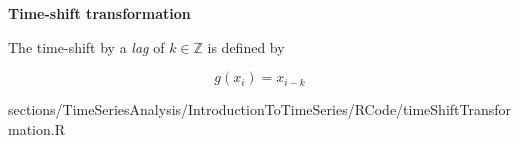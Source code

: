 			
			\RTheory
			{
				\textbf{Time-shift transformation}
								
				The time-shift by a \textit{lag} of $k \in \mathbb{Z}$ is defined by
					
					$$g(x_i)=x_{i-k} $$ 
				
			
			}
			{
				sections/TimeSeriesAnalysis/IntroductionToTimeSeries/RCode/timeShiftTransformation.R
			}
			
			

